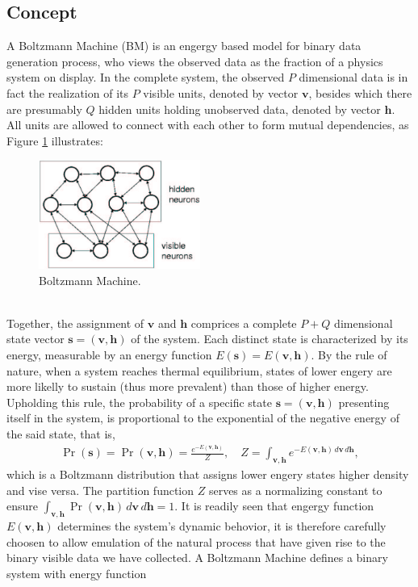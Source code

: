\documentclass[11pt]{article}
\newcommand{\vh}{\boldsymbol{h}}
\newcommand{\vv}{\boldsymbol{v}}
\newcommand{\vs}{\boldsymbol{s}}
\begin{document}
\subsection{Concept}
A Boltzmann Machine (BM) is an engergy based model for binary data generation process, who views the observed data as the fraction of a physics system on display. In the complete system, the observed $P$ dimensional data is in fact the realization of its $P$ visible units, denoted by vector $\vv$, besides which there are presumably $Q$ hidden units holding unobserved data, denoted by vector $\vh$. All units are allowed to connect with each other to form mutual dependencies, as Figure \ref{fig:gbm} illustrates:
\begin{figure}[h]
  \centering
  \includegraphics[width=200px]{img/gbm.png}
  \caption{Boltzmann Machine.}\label{fig:gbm}
\end{figure} \\
Together, the assignment of $\vv$ and $\vh$ comprices a complete $P+Q$ dimensional state vector $\vs =(\vv, \vh)$ of the system. Each distinct state is characterized by its energy, measurable by an energy function $E(\vs) = E(\vv, \vh)$. By the rule of nature, when a system reaches thermal equilibrium, states of lower engery are more likelly to sustain (thus more prevalent) than those of higher energy. Upholding this rule, the probability of a specific state $\vs=(\vv, \vh)$ presenting itself in the system, is proportional to the exponential of the negative energy of the said state, that is,
\begin{equation} \label{eq:p(s)}  %
  \begin{split}
    \Pr(\vs) = \Pr(\vv, \vh) = \frac{e^{-E(\vv, \vh)}}{Z}, \quad Z = \int_{\vv,\vh} e^{-E(\vv, \vh) \,d\vv\,d\vh},
  \end{split}
\end{equation}
which is a Boltzmann distribution that assigns lower engery states higher density and vise versa. The partition function $Z$ serves as a normalizing constant to ensure $\int_{\vv, \vh} \Pr(\vv, \vh) \,d\vv\,d\vh = 1$. It is readily seen that engergy function $E(\vv, \vh)$ determines the system's dynamic behovior, it is therefore carefully choosen to allow emulation of the natural process that have given rise to the binary visible data we have collected. A Boltzmann Machine defines a binary system with energy function
\end{document}
